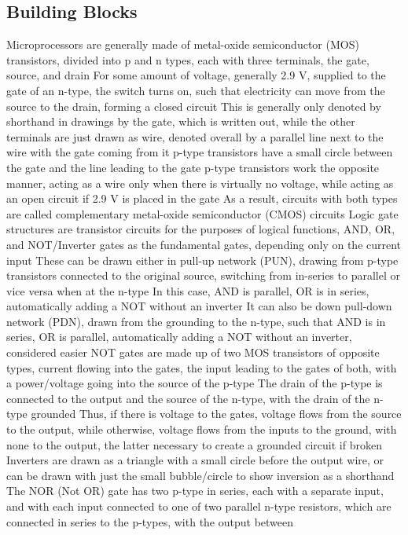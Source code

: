 \documentclass[11 pt, twoside]{article}
\newenvironment{outline*}
{
	\begin{outline}[enumerate]
	}
	{\end{outline}
}
\begin{document}
\subsection{Building Blocks}
\begin{outline*}
\1 Microprocessors are generally made of metal-oxide semiconductor (MOS) transistors, divided into p and n types, each with three terminals, the gate, source, and drain
\2 For some amount of voltage, generally 2.9 V, supplied to the gate of an n-type, the switch turns on, such that electricity can move from the source to the drain, forming a closed circuit
\3 This is generally only denoted by shorthand in drawings by the gate, which is written out, while the other terminals are just drawn as wire, denoted overall by a parallel line next to the wire with the gate coming from it
\3 p-type transistors have a small circle between the gate and the line leading to the gate
\2 p-type transistors work the opposite manner, acting as a wire only when there is virtually no voltage, while acting as an open circuit if 2.9 V is placed in the gate
\2 As a result, circuits with both types are called complementary metal-oxide semiconductor (CMOS) circuits
\1 Logic gate structures are transistor circuits for the purposes of logical functions, AND, OR, and NOT/Inverter gates as the fundamental gates, depending only on the current input
\2 These can be drawn either in pull-up network (PUN), drawing from p-type transistors connected to the original source, switching from in-series to parallel or vice versa when at the n-type
\3 In this case, AND is parallel, OR is in series, automatically adding a NOT without an inverter
\3 It can also be down pull-down network (PDN), drawn from the grounding to the n-type, such that AND is in series, OR is parallel, automatically adding a NOT without an inverter, considered easier
\2 NOT gates are made up of two MOS transistors of opposite types, current flowing into the gates, the input leading to the gates of both, with a power/voltage going into the source of the p-type
\3 The drain of the p-type is connected to the output and the source of the n-type, with the drain of the n-type grounded
\3 Thus, if there is voltage to the gates, voltage flows from the source to the output, while otherwise, voltage flows from the inputs to the ground, with none to the output, the latter necessary to create a grounded circuit if broken
\3 Inverters are drawn as a triangle with a small circle before the output wire, or can be drawn with just the small bubble/circle to show inversion as a shorthand
\2 The NOR (Not OR) gate has two p-type in series, each with a separate input, and with each input connected to one of two parallel n-type resistors, which are connected in series to the p-types, with the output between

\end{outline*}
\end{document}
